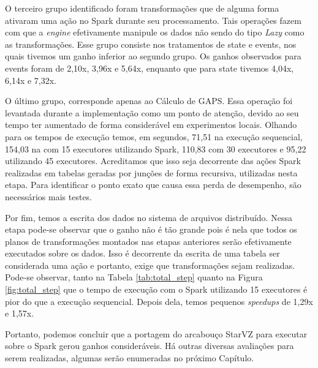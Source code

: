 O terceiro grupo identificado foram transformações que de alguma forma ativaram 
uma ação no Spark durante seu processamento. Tais operações fazem com que a 
\textit{engine} efetivamente manipule os dados \cite{ref:sparkbook} não sendo 
do tipo \textit{Lazy} como as transformações. Esse grupo consiste nos 
tratamentos de state e events, nos quais tivemos um ganho inferior ao segundo 
grupo. Os ganhos observados para events foram de 2,10x, 3,96x e 5,64x, enquanto 
que para state tivemos 4,04x, 6,14x e 7,32x.

O último grupo, corresponde apenas ao Cálculo de GAPS. Essa operação foi 
levantada durante a implementação como um ponto de atenção, devido ao seu tempo 
ter aumentado de forma considerável em experimentos locais. Olhando para os 
tempos de execução temos, em segundos, 71,51 na execução sequencial, 154,03 na 
com 15 executores utilizando Spark, 110,83 com 30 executores e 95,22 utilizando 
45 executores. Acreditamos que isso seja decorrente das ações Spark realizadas 
em tabelas geradas por junções de forma recursiva, utilizadas nesta etapa. Para 
identificar o ponto exato que causa essa perda de desempenho, são necessários 
mais testes.

Por fim, temos a escrita dos dados no sistema de arquivos distribuído. Nessa 
etapa pode-se observar que o ganho não é tão grande pois é nela que todos os 
planos de transformações montados nas etapas anteriores serão efetivamente 
executados sobre os dados. Isso é decorrente da escrita de uma tabela ser
considerada uma ação e portanto, exige que transformações sejam realizadas.
Pode-se observar, tanto na Tabela 
\ref{tab:total_step} quanto na Figura \ref{fig:total_step} que o tempo de 
execução com o Spark utilizando 15 executores é pior do que a execução 
sequencial. Depois dela, temos pequenos \textit{speedups} de 1,29x e 1,57x.

Portanto, podemos concluir que a portagem do arcabouço StarVZ para executar 
sobre o Spark gerou ganhos consideráveis. Há outras diversas avaliações para 
serem realizadas, algumas serão enumeradas no próximo Capítulo.



